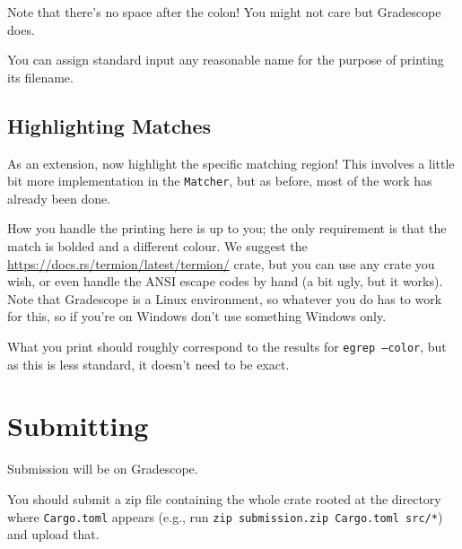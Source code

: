 \documentclass{article}
\begin{document}
Note that there's no space after the colon! You might not care but Gradescope
does.

You can assign standard input any reasonable name for the purpose of printing
its filename.

\subsection*{Highlighting Matches}

As an extension, now highlight the specific matching region! This involves a
little bit more implementation in the \texttt{Matcher}, but as before, most of
the work has already been done.

How you handle the printing here is up to you; the only requirement is that the
match is bolded and a different colour. We suggest the
\href{termion}{https://docs.rs/termion/latest/termion/} crate, but you can use
any crate you wish, or even handle the ANSI escape codes by hand (a bit ugly,
but it works). Note that Gradescope is a Linux environment, so whatever you do
has to work for this, so if you're on Windows don't use something Windows only.

What you print should roughly correspond to the results for \texttt{egrep
--color}, but as this is less standard, it doesn't need to be exact.

\section*{Submitting}

Submission will be on Gradescope.

You should submit a zip file containing the whole crate rooted at the directory
where \texttt{Cargo.toml} appears (e.g., run \texttt{zip submission.zip Cargo.toml
src/*}) and upload that.
\end{document}
